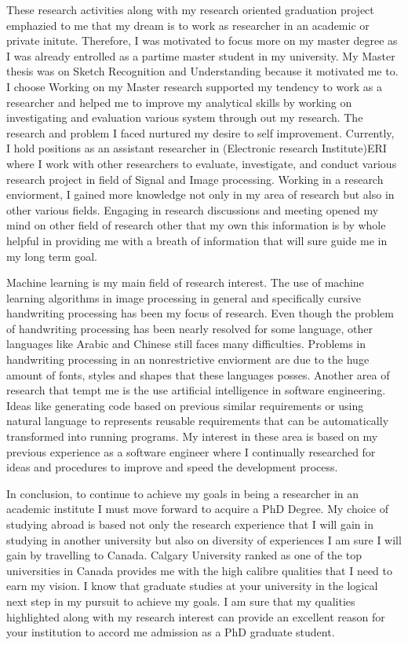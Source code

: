 \documentclass[a4paper,12pt]{article}%
\begin{document}
 
 These research activities along with my research oriented graduation project emphazied to me that my dream is to work as researcher in an academic or private initute. Therefore, I was motivated to focus more on my master degree as I was already entrolled as a partime master student in my  university. My Master thesis was on Sketch Recognition and Understanding because it motivated me to. I choose  Working on my Master research supported my tendency to work as a researcher and helped me to improve my analytical skills by working on investigating and evaluation various system through out my research. The research and problem  I faced nurtured my desire to self improvement. Currently, I hold positions as an assistant researcher in (Electronic research Institute)ERI where I work with other researchers to evaluate, investigate, and conduct  various research project in field of Signal and Image processing. Working in a research enviorment, I gained more knowledge not only in my area of research but also in other various fields. Engaging in research discussions and meeting opened my mind  on other field of research other that my own this information is by whole helpful in providing me with a breath of information that will sure guide me in my long term goal.  
 
 
 Machine learning is my main field of research interest. The use of machine learning algorithms in image processing in general and specifically cursive handwriting processing has been my focus of research. Even though the problem of handwriting processing has been nearly resolved for some language, other languages like Arabic and Chinese still faces many difficulties. Problems in handwriting processing in an nonrestrictive enviorment are due to the huge amount of fonts, styles and shapes that these languages posses. Another area of research that tempt me is the use artificial intelligence in software engineering. Ideas like  generating code based on previous similar requirements or using natural language to represents reusable requirements that can be automatically transformed into running programs. My interest in these area is based on my previous experience as a software engineer where I continually researched for ideas and procedures to improve and speed the development process.        
 
 
  In conclusion, to continue to achieve my goals in being a researcher in an academic institute I must move forward to acquire a PhD Degree. My choice of studying abroad is based not only the research experience that I will gain in  studying in another university but also on diversity of experiences I am sure I will gain by travelling to Canada. Calgary University ranked as one of the top universities in Canada provides me with the high calibre qualities that I need to earn my vision. I know that graduate studies at your university in the logical next step in my pursuit to achieve my goals. I am sure that my qualities highlighted along with my research interest can provide an excellent reason for your institution to accord me admission as  a PhD graduate student.


\end{document}
